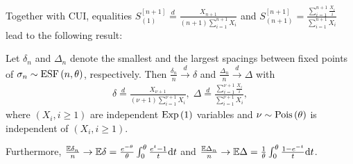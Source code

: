 \documentclass[12pt,pdf,aspectratio=169,t]{beamer}
\begin{document}
\begin{frame}[allowframebreaks]
        Together with CUI, equalities 
        $S_{(1)}^{[n+1]} \overset{d}{=} \frac{X_{n + 1}}{(n + 1)\sum_{i=1}^{n+1} X_i}$ and 
        $S_{(n+1)}^{[n+1]} = \frac{\sum_{i=1}^{n+1} \frac{X_i}{i}}{\sum_{i=1}^{n+1} X_i}$ lead to the following result:
        \pagebreak
        \begin{theorem}
            Let $\delta_n$ and $\Delta_n$ denote the smallest and the largest
            spacings between fixed points of $\sigma_n \sim \mathrm{ESF}\left(n, \theta\right)$, respectively.
            Then $\frac{\delta_n}{n} \overset{d}{\longrightarrow} \delta$ and 
            $\frac{\Delta_n}{n} \overset{d}{\longrightarrow} \Delta$ with
            \begin{gather}
                \delta \overset{d}{=}
                \frac{X_{\nu + 1}}{(\nu + 1)\sum_{i=1}^{\nu+1} X_i}, \;
                \Delta \overset{d}{=} 
                \frac{\sum_{i=1}^{\nu+1} \frac{X_i}{i}}{\sum_{i=1}^{\nu+1} X_i},
            \end{gather}
            where $\left(X_i, i\geq 1\right)$ are 
            independent $\mathrm{Exp}\left(1\right)$ variables and $\nu \sim \mathrm{Pois}\left(\theta\right)$
            is independent of $\left(X_i, i\geq 1\right)$.

            Furthermore, $\frac{\mathbb{E} \delta_n}{n} \to \mathbb{E} \delta = \frac{e^{-\theta}}{\theta} \int_0^{\theta} \frac{e^t - 1}{t} \mathrm{d} t$
            and $\frac{\mathbb{E} \Delta_n}{n} \to \mathbb{E} \Delta = \frac{1}{\theta} \int_0^{\theta} \frac{1 - e^{-t}}{t} \mathrm{d} t$.
        \end{theorem}
    \end{frame}
\end{document}
